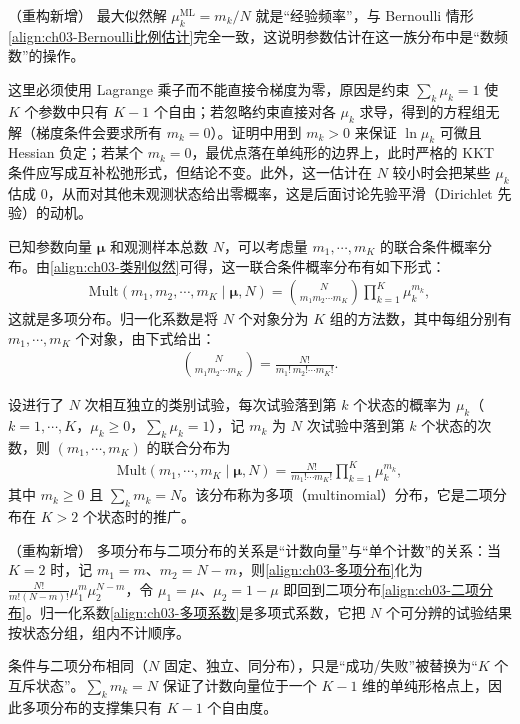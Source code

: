\documentclass[../../main.tex]{subfiles}
\begin{document}
\begin{remark}（重构新增）
最大似然解 $\mu_k^{\mathrm{ML}}=m_k/N$ 就是“经验频率”，与 Bernoulli 情形\eqref{align:ch03-Bernoulli比例估计}完全一致，这说明参数估计在这一族分布中是“数频数”的操作。

这里必须使用 Lagrange 乘子而不能直接令梯度为零，原因是约束 $\sum_k\mu_k=1$ 使 $K$ 个参数中只有 $K-1$ 个自由；若忽略约束直接对各 $\mu_k$ 求导，得到的方程组无解（梯度条件会要求所有 $m_k=0$）。证明中用到 $m_k>0$ 来保证 $\ln\mu_k$ 可微且 Hessian 负定；若某个 $m_k=0$，最优点落在单纯形的边界上，此时严格的 KKT 条件应写成互补松弛形式，但结论不变。此外，这一估计在 $N$ 较小时会把某些 $\mu_k$ 估成 $0$，从而对其他未观测状态给出零概率，这是后面讨论先验平滑（Dirichlet 先验）的动机。
\end{remark}

已知参数向量 $\boldsymbol{\mu}$ 和观测样本总数 $N$，可以考虑量 $m_1,\cdots,m_K$ 的联合条件概率分布。由\eqref{align:ch03-类别似然}可得，这一联合条件概率分布有如下形式：
\begin{align}
\mathrm{Mult}(m_1,m_2,\cdots,m_K\mid\boldsymbol{\mu},N)=\binom{N}{m_1m_2\cdots m_K}\prod_{k=1}^{K}\mu_k^{m_k},
\label{align:ch03-多项分布}
\end{align}
这就是多项分布。归一化系数是将 $N$ 个对象分为 $K$ 组的方法数，其中每组分别有 $m_1,\cdots,m_K$ 个对象，由下式给出：
\begin{align}
\binom{N}{m_1m_2\cdots m_K}=\frac{N!}{m_1!\,m_2!\cdots m_K!}.
\label{align:ch03-多项系数}
\end{align}

\begin{definition}[多项分布]\label{definition:ch03-多项分布}
设进行了 $N$ 次相互独立的类别试验，每次试验落到第 $k$ 个状态的概率为 $\mu_k$（$k=1,\cdots,K$，$\mu_k\geqslant0$，$\sum_k\mu_k=1$），记 $m_k$ 为 $N$ 次试验中落到第 $k$ 个状态的次数，则 $(m_1,\cdots,m_K)$ 的联合分布为
\begin{align*}
\mathrm{Mult}(m_1,\cdots,m_K\mid\boldsymbol{\mu},N)=\frac{N!}{m_1!\cdots m_K!}\prod_{k=1}^{K}\mu_k^{m_k},
\end{align*}
其中 $m_k\geqslant0$ 且 $\sum_k m_k=N$。该分布称为多项（multinomial）分布，它是二项分布在 $K>2$ 个状态时的推广。
\end{definition}

\begin{remark}（重构新增）
多项分布与二项分布的关系是“计数向量”与“单个计数”的关系：当 $K=2$ 时，记 $m_1=m$、$m_2=N-m$，则\eqref{align:ch03-多项分布}化为 $\frac{N!}{m!(N-m)!}\mu_1^{m}\mu_2^{N-m}$，令 $\mu_1=\mu$、$\mu_2=1-\mu$ 即回到二项分布\eqref{align:ch03-二项分布}。归一化系数\eqref{align:ch03-多项系数}是多项式系数，它把 $N$ 个可分辨的试验结果按状态分组，组内不计顺序。

条件与二项分布相同（$N$ 固定、独立、同分布），只是“成功/失败”被替换为“$K$ 个互斥状态”。$\sum_k m_k=N$ 保证了计数向量位于一个 $K-1$ 维的单纯形格点上，因此多项分布的支撑集只有 $K-1$ 个自由度。
\end{remark}
\end{document}
